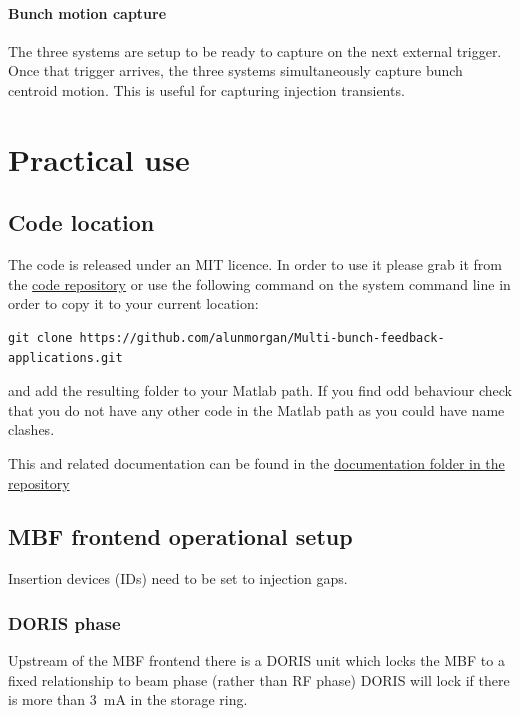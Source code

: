 \documentclass{report}
\begin{document}
\subsubsection{Bunch motion capture}
The three systems are setup to be ready to capture on the next external trigger. Once that trigger arrives, the three systems simultaneously capture bunch centroid motion. This is useful for capturing injection transients. 

\chapter{Practical use}
\section{Code location }
The code is released under an MIT licence. In order to use it please grab it from the \href{https://github.com/alunmorgan/Multi-bunch-feedback-applications}{code repository}
or use the following command on the system command line in order to copy it to your current location:
\begin{verbatim}
git clone https://github.com/alunmorgan/Multi-bunch-feedback-applications.git
\end{verbatim}
and add the resulting folder to your Matlab path. If you find odd behaviour check that you do not have any other code in the Matlab path as you could have name clashes.

This and related documentation can be found in the \href{https://github.com/alunmorgan/Multi-bunch-feedback-applications/Documentation}{documentation folder in the repository}

 \section{MBF frontend operational setup}
 Insertion devices (IDs) need to be set to injection gaps.
\subsection{DORIS phase}
Upstream of the MBF frontend there is a DORIS unit which locks the MBF to a fixed relationship to beam phase (rather than RF phase) 
DORIS will lock if there is more than 3~mA in the storage ring.
\end{document}
